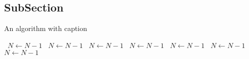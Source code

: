 \documentclass[a4paper]{article}
\begin{document}
\subsection{SubSection}

\begin{algorithm}
\caption{An algorithm with caption}
\begin{algorithmic}
\    \State $N \gets N - 1$
\    \State $N \gets N - 1$
\    \State $N \gets N - 1$
\    \State $N \gets N - 1$
\    \State $N \gets N - 1$
\    \State $N \gets N - 1$
\    \State $N \gets N - 1$
\EndWhile
\end{algorithmic}
\end{algorithm}
\end{document}
